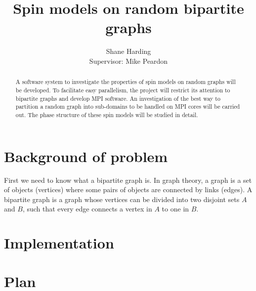 \documentclass{article}
\begin{document}
\title{Spin models on random bipartite graphs}
\author{Shane Harding \\ Supervisor: Mike Peardon}

\maketitle

\begin{abstract}
A software system to investigate the properties of spin models on random graphs will be developed. To facilitate easy parallelism, the project will restrict its attention to bipartite graphs and develop MPI software. An investigation of the best way to partition a random graph into sub-domains to be handled on MPI cores will be carried out. The phase structure of these spin models will be studied in detail.
\end{abstract}

\section{Background of problem}

First we need to know what a bipartite graph is. In graph theory, a graph is a set of objects (vertices) where some pairs of objects are connected by links (edges). A bipartite graph is a graph whose vertices can be divided into two disjoint sets $A$ and $B$, such that every edge connects a vertex in $A$ to one in $B$.

\section{Implementation}

\section{Plan}
\end{document}
